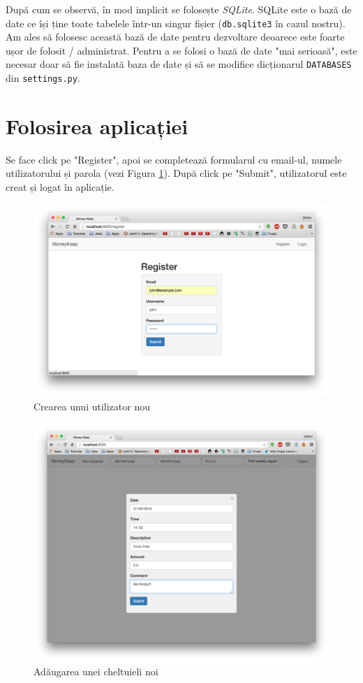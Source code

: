 După cum se observă, în mod implicit se folosește \emph{SQLite}.
SQLite este o bază de date ce își ține toate tabelele într-un
singur fișier (\texttt{db.sqlite3} în cazul nostru). Am ales
să folosesc această bază de date pentru dezvoltare
deoarece este foarte ușor de folosit / administrat.
Pentru a se folosi o bază de date "mai serioasă", este necesar
doar să fie instalată baza de date și să se modifice dicționarul
\texttt{DATABASES} din \texttt{settings.py}.


\section{Folosirea aplicației}

Se face click pe "Register", apoi se completează formularul cu 
email-ul, numele utilizatorului și parola (vezi Figura \ref{fig:register}).
După click pe "Submit", utilizatorul este creat și logat în aplicație.

\begin{figure}
  \includegraphics[width=1\textwidth]{./chap5-files/register}
  \caption{Crearea unui utilizator nou}
  \label{fig:register}
\end{figure}

\begin{figure}
  \includegraphics[width=1\textwidth]{./chap5-files/new-expense}
  \caption{Adăugarea unei cheltuieli noi}
  \label{fig:new-expense}
\end{figure}

